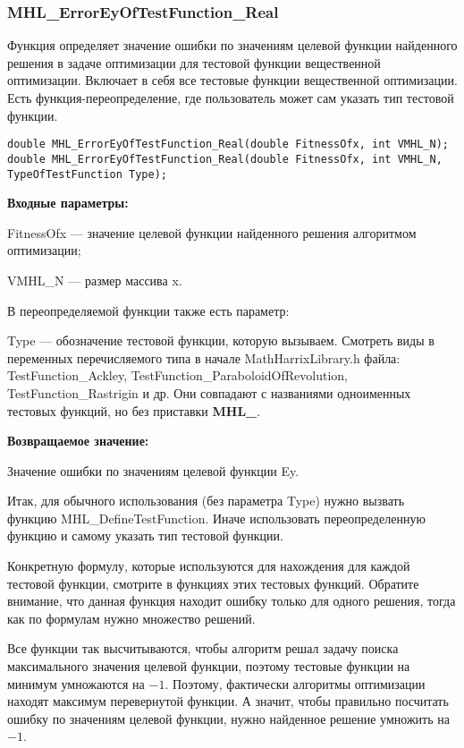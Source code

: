 \documentclass[a4paper,12pt]{article}
\begin{document}
\subsubsection{MHL\_ErrorEyOfTestFunction\_Real}\label{MHL_ErrorEyOfTestFunction_Real}

Функция определяет значение ошибки по значениям целевой функции найденного решения в задаче оптимизации для тестовой функции вещественной оптимизации. Включает в себя все тестовые функции вещественной оптимизации. Есть функция-переопределение, где пользователь может сам указать тип тестовой функции.


\begin{lstlisting}[label=code_syntax_MHL_ErrorEyOfTestFunction_Real,caption=Синтаксис]
double MHL_ErrorEyOfTestFunction_Real(double FitnessOfx, int VMHL_N);
double MHL_ErrorEyOfTestFunction_Real(double FitnessOfx, int VMHL_N, TypeOfTestFunction Type);
\end{lstlisting}

\textbf{Входные параметры:}

FitnessOfx --- значение целевой функции найденного решения алгоритмом оптимизации;

VMHL\_N --- размер массива x.

В переопределяемой функции также есть параметр:
  
Type --- обозначение тестовой функции, которую вызываем.
Смотреть виды в переменных перечисляемого типа в начале MathHarrixLibrary.h файла: TestFunction\_Ackley, TestFunction\_ParaboloidOfRevolution, TestFunction\_Rastrigin и др. Они совпадают с названиями одноименных тестовых функций, но без приставки \textbf{MHL\_}.

\textbf{Возвращаемое значение:}
 
Значение ошибки по значениям целевой функции Ey.

Итак, для обычного использования (без параметра Type) нужно вызвать функцию MHL\_DefineTestFunction. Иначе использовать переопределенную функцию и самому указать тип тестовой функции.

Конкретную формулу, которые используются для нахождения для каждой тестовой функции, смотрите в функциях этих тестовых функций. Обратите внимание, что данная функция находит ошибку только для одного решения, тогда как по формулам нужно множество решений.

Все функции так высчитываются, чтобы алгоритм решал задачу поиска максимального значения целевой функции, поэтому тестовые функции на минимум умножаются на $-1$. Поэтому, фактически алгоритмы оптимизации находят максимум перевернутой функции. А значит, чтобы правильно посчитать ошибку по значениям целевой функции, нужно найденное решение умножить на $-1$.
\end{document}
